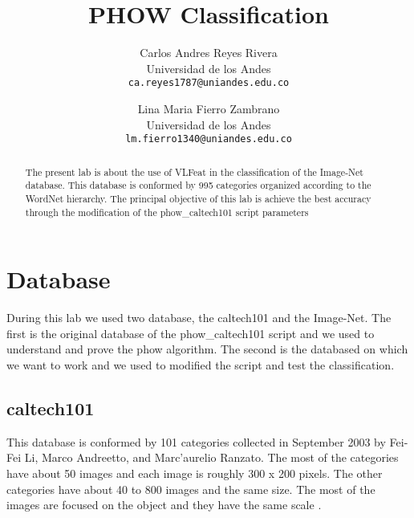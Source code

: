 \documentclass[10pt,twocolumn,letterpaper]{article}
\begin{document}
\title{PHOW Classification}

\author{Carlos Andres Reyes Rivera\\
Universidad de los Andes\\
{\tt\small ca.reyes1787@uniandes.edu.co}
\and
Lina Maria Fierro Zambrano\\
Universidad de los Andes\\
{\tt\small lm.fierro1340@uniandes.edu.co}
}

\maketitle

\begin{abstract}

The present lab is about the use of VLFeat in the classification of the Image-Net database. This database is conformed by 995 categories organized according to the WordNet hierarchy. The principal objective of this lab is achieve the best accuracy through the modification of the phow\_caltech101 script parameters 


\end{abstract}


\section{Database}

During this lab we used two database, the caltech101 and the  Image-Net. The first is the original database of the phow\_caltech101 script and we used to understand and prove the phow algorithm. The second is the databased on which we want to work and we used to modified the script and test the classification.

\subsection{caltech101}

This database is conformed by 101 categories collected in September 2003 by Fei-Fei Li, Marco Andreetto, and Marc'aurelio Ranzato. The most of the categories have about 50 images and each image is roughly 300 x 200 pixels. The other categories have about 40 to 800 images and the same size. The most of the images are focused on the object and they have the same scale \cite{1}.
\end{document}
